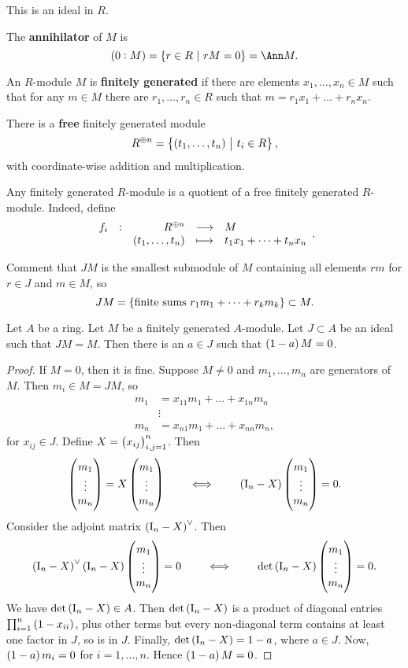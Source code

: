 This is an ideal in $ R $.

\begin{example*}
The \textbf{annihilator} of $ M $ is
$$ \br{0 : M} = \cbr{r \in R \st rM = 0} = \Ann M. $$
\end{example*}

\pagebreak

\begin{definition}
An $ R $-module $ M $ is \textbf{finitely generated} if there are elements $ x_1, \dots, x_n \in M $ such that for any $ m \in M $ there are $ r_1, \dots, r_n \in R $ such that $ m = r_1x_1 + \dots + r_nx_n $.
\end{definition}

\begin{example*}
There is a \textbf{free} finitely generated module
$$ R^{\oplus n} = \cbr{\br{t_1, \dots, t_n} \st t_i \in R}, $$
with coordinate-wise addition and multiplication.
\end{example*}

\begin{remark*}
Any finitely generated $ R $-module is a quotient of a free finitely generated $ R $-module. Indeed, define
$$ \function[f_i]{R^{\oplus n}}{M}{\br{t_1, \dots, t_n}}{t_1x_1 + \dots + t_nx_n}. $$
\end{remark*}

Comment that $ JM $ is the smallest submodule of $ M $ containing all elements $ rm $ for $ r \in J $ and $ m \in M $, so
$$ JM = \cbr{\text{finite sums} \ r_1m_1 + \dots + r_km_k} \subset M. $$

\begin{lemma}
\label{lem:9.7}
Let $ A $ be a ring. Let $ M $ be a finitely generated $ A $-module. Let $ J \subset A $ be an ideal such that $ JM = M $. Then there is an $ a \in J $ such that $ \br{1 - a}M = 0 $.
\end{lemma}

\begin{proof}
If $ M = 0 $, then it is fine. Suppose $ M \ne 0 $ and $ m_1, \dots, m_n $ are generators of $ M $. Then $ m_i \in M = JM $, so
\begin{align*}
m_1 & = x_{11}m_1 + \dots + x_{1n}m_n \\
& \vdots \\
m_n & = x_{n1}m_1 + \dots + x_{nn}m_n,
\end{align*}
for $ x_{ij} \in J $. Define $ X = \br{x_{ij}}_{i, j = 1}^n $. Then
$$ \threebyone{m_1}{\vdots}{m_n} = X\threebyone{m_1}{\vdots}{m_n} \qquad \iff \qquad \br{\I_n - X}\threebyone{m_1}{\vdots}{m_n} = 0. $$
Consider the adjoint matrix $ \br{\I_n - X}^\vee $. Then
$$ \br{\I_n - X}^\vee\br{\I_n - X}\threebyone{m_1}{\vdots}{m_n} = 0 \qquad \iff \qquad \det \br{\I_n - X}\threebyone{m_1}{\vdots}{m_n} = 0. $$
We have $ \det \br{\I_n - X} \in A $. Then $ \det \br{\I_n - X} $ is a product of diagonal entries $ \prod_{i = 1}^n \br{1 - x_{ii}} $, plus other terms but every non-diagonal term contains at least one factor in $ J $, so is in $ J $. Finally, $ \det \br{\I_n - X} = 1 - a $, where $ a \in J $. Now, $ \br{1 - a}m_i = 0 $ for $ i = 1, \dots, n $. Hence $ \br{1 - a}M = 0 $.
\end{proof}

